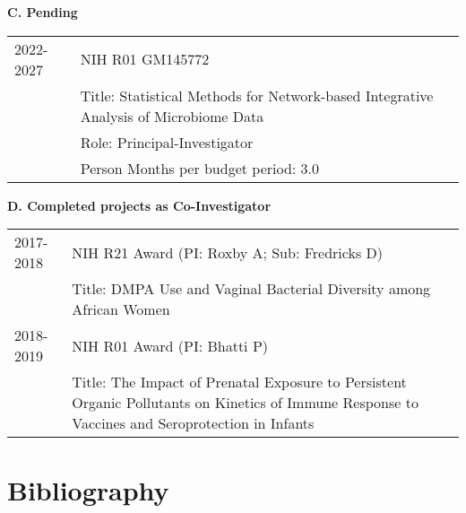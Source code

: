 \documentclass[10pt]{article}
\begin{document}
\textbf{C. Pending}

\begin{table}[H]
\hskip0.9cm\begin{tabular}{p{1.6cm}p{12cm}}
2022-2027 & NIH R01 GM145772 \\
& Title: Statistical Methods for Network-based Integrative Analysis of Microbiome Data \\
& Role: Principal-Investigator\\
& Person Months per budget period: 3.0
\end{tabular}
\end{table}
%


 \textbf{D. Completed projects as Co-Investigator}
\begin{table}[H]
\hskip0.9cm\begin{tabular}{p{1.6cm}p{12cm}}
2017-2018 & NIH R21 Award (PI: Roxby A; Sub: Fredricks D)\\
&		Title: DMPA Use and Vaginal Bacterial Diversity among African Women\\
2018-2019 & NIH R01 Award (PI: Bhatti P)\\
&	Title: The Impact of Prenatal Exposure to Persistent Organic Pollutants on Kinetics of Immune Response to Vaccines and Seroprotection in Infants\\
\end{tabular}
\end{table}

\section{Bibliography}
\end{document}
